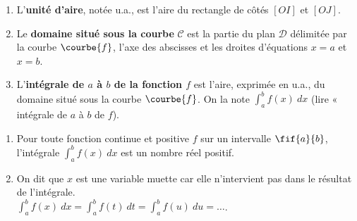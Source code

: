 \documentclass[a4paper,11pt,cours]{nsi} %
\begin{document}
\begin{definition}[s]
    \begin{enumerate}[label=\textbullet]
        \item L'\textbf{unité d'aire}, notée u.a., est l'aire du rectangle de côtés $[OI]$ et $[OJ]$.
        \item Le \textbf{domaine situé sous la courbe} $\mathcal{C}$ est la partie du plan $\mathcal{D}$ délimitée par la courbe $\courbe{f}$, l'axe des abscisses et les droites d'équations $x=a$ et $x=b$.
        \item L'\textbf{intégrale de $a$ à $b$ de la fonction $f$} est l'aire, exprimée en u.a., du domaine situé sous la courbe $\courbe{f}$. On la note $\displaystyle \int_a^b f(x) \ dx$ (lire « intégrale de $a$ à $b$ de $f$).
    \end{enumerate}
\end{definition}

\begin{remarque}[s]
    \begin{enumerate}[label=\textbullet]
        \item Pour toute fonction continue et positive $f$ sur un intervalle $\fif{a}{b}$, l'intégrale $\displaystyle \int_a^b f(x) \ dx$ est un nombre réel positif.
        \item On dit que $x$ est une variable muette car elle n'intervient pas dans le résultat de l'intégrale.\\
        $\displaystyle \int_a^b f(x) \ dx= \int_a^b f(t) \ dt = \int_a^b f(u) \ du=\ldots$.
    \end{enumerate}
\end{remarque}
\newpage
\end{document}
